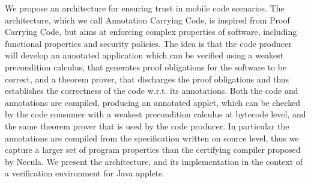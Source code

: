 
We propose an architecture for ensuring trust in mobile code
scenarios. The architecture, which we call Annotation Carrying Code,
is inspired from Proof Carrying Code, but aims at enforcing complex
properties of software, including functional properties and security
policies. The idea is that the code producer will develop an annotated
application which can be verified using a weakest precondition
calculus, that generates proof obligations for the software to be
correct, and a theorem prover, that discharges the proof obligations
and thus establishes the correctness of the code w.r.t. its
annotations. Both the code and annotations are compiled, producing
an annotated applet, which can be checked by the code consumer with a
weakest precondition calculus at bytecode level, and the same theorem
prover that is used by the code producer. In particular the annotations 
are compiled from the specification written on source level, thus we capture
a larger set of program properties than the certifying compiler proposed by Necula. 
We present the architecture, and its implementation 
in the context of a verification environment for Java applets.



